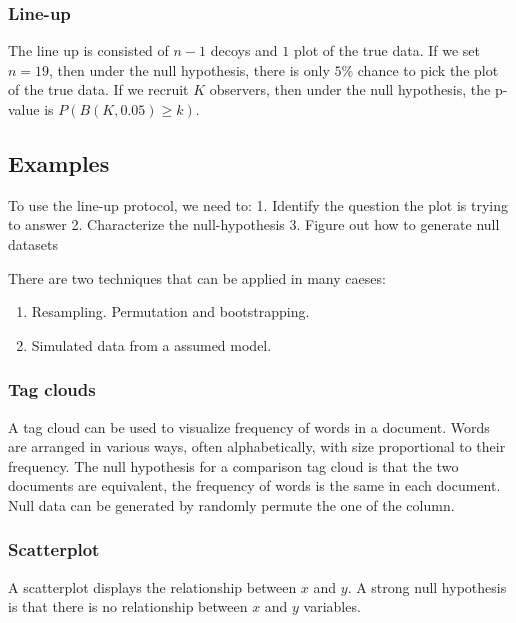 \documentclass[
]{book}
\providecommand{\tightlist}{%
  \setlength{\itemsep}{0pt}\setlength{\parskip}{0pt}}
\begin{document}
\hypertarget{line-up}{%
\subsubsection{Line-up}\label{line-up}}

The line up is consisted of \(n-1\) decoys and \(1\) plot of the true data. If we set \(n = 19\), then under the null hypothesis, there is only \(5\)\% chance to pick the plot of the true data. If we recruit \(K\) observers, then under the null hypothesis, the p-value is \(P(B(K, 0.05) \geq k)\).

\hypertarget{examples}{%
\subsection{Examples}\label{examples}}

To use the line-up protocol, we need to:
1. Identify the question the plot is trying to answer
2. Characterize the null-hypothesis
3. Figure out how to generate null datasets

There are two techniques that can be applied in many caeses:

\begin{enumerate}
\def\labelenumi{\arabic{enumi}.}
\tightlist
\item
  Resampling. Permutation and bootstrapping.
\item
  Simulated data from a assumed model.
\end{enumerate}

\hypertarget{tag-clouds}{%
\subsubsection{Tag clouds}\label{tag-clouds}}

A tag cloud can be used to visualize frequency of words in a document. Words are arranged in various ways, often alphabetically, with size proportional to their frequency. The null hypothesis for a comparison tag cloud is that the two documents are equivalent, the frequency of words is the same in each document. Null data can be generated by randomly permute the one of the column.

\hypertarget{scatterplot}{%
\subsubsection{Scatterplot}\label{scatterplot}}

A scatterplot displays the relationship between \(x\) and \(y\). A strong null hypothesis is that there is no relationship between \(x\) and \(y\) variables.
\end{document}

